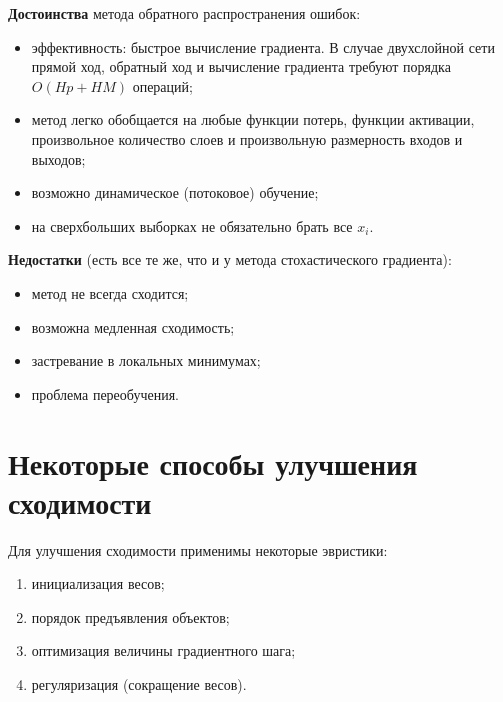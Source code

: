 \documentclass{article}
\begin{document}
	\textbf{Достоинства} метода обратного распространения ошибок:
	\begin{itemize}
		\item эффективность: быстрое вычисление градиента. В случае двухслойной сети прямой ход, обратный ход и вычисление градиента требуют порядка $O(Hp+HM)$ операций;
		\item метод легко обобщается на любые функции потерь, функции активации, произвольное количество слоев и произвольную размерность входов и выходов;
		\item возможно динамическое (потоковое) обучение;
		\item на сверхбольших выборках не обязательно брать все $x_i$.
	\end{itemize}
	
	\textbf{Недостатки} (есть все те же, что и у метода стохастического градиента):
	\begin{itemize}
		\item метод не всегда сходится;
		\item возможна медленная сходимость;
		\item застревание в локальных минимумах;
		\item проблема переобучения.
	\end{itemize}
	
	\section{Некоторые способы улучшения сходимости}
	
	Для улучшения сходимости применимы некоторые эвристики:
	\begin{enumerate}
		\item инициализация весов;
		\item порядок предъявления объектов;
		\item оптимизация величины градиентного шага;
		\item регуляризация (сокращение весов). 
	\end{enumerate} 
	
\end{document}
